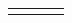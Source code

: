 {\begin{tabular}[t]{|l|l|l|l|}
         &
    
    
         &
    
    
     \tabularnewline\cline{1-1}\cline{2-2}\cline{3-3}\cline{4-4}
    \end{tabular}} %
      \addtocounter{footnote}{-0}
      
    
